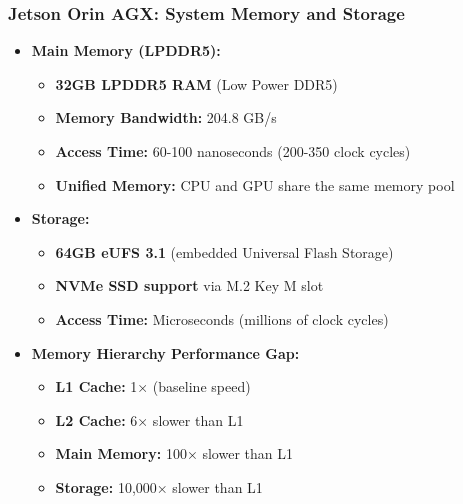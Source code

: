 \begin{frame}
\frametitle{Jetson Orin AGX: System Memory and Storage}
\begin{itemize}
    \item \textbf{Main Memory (LPDDR5):}
    \begin{itemize}
        \item \textbf{32GB LPDDR5 RAM} (Low Power DDR5)
        \item \textbf{Memory Bandwidth:} 204.8 GB/s
        \item \textbf{Access Time:} 60-100 nanoseconds (200-350 clock cycles)
        \item \textbf{Unified Memory:} CPU and GPU share the same memory pool
    \end{itemize}
    \item \textbf{Storage:}
    \begin{itemize}
        \item \textbf{64GB eUFS 3.1} (embedded Universal Flash Storage)
        \item \textbf{NVMe SSD support} via M.2 Key M slot
        \item \textbf{Access Time:} Microseconds (millions of clock cycles)
    \end{itemize}
    \item \textbf{Memory Hierarchy Performance Gap:}
    \begin{itemize}
        \item \textbf{L1 Cache:} 1× (baseline speed)
        \item \textbf{L2 Cache:} 6× slower than L1
        \item \textbf{Main Memory:} 100× slower than L1
        \item \textbf{Storage:} 10,000× slower than L1
    \end{itemize}
\end{itemize}
\end{frame}

